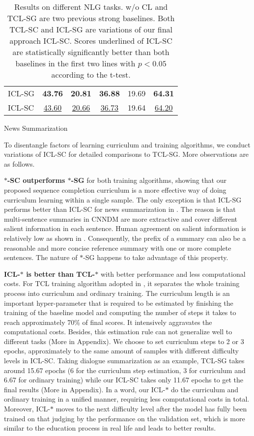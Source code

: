 \begin{table}[t]
\begin{subtable}{\linewidth}
\begin{tabular}{lccccc}
			ICL-SG & \textbf{43.76} & \textbf{20.81} & \textbf{36.88} & 19.69 & \textbf{64.31}\\
			ICL-SC & \underline{{43.60}} & \underline{{20.66}} & \underline{{36.73}} & 19.64 & \underline{{64.20}}\\
			\hline
		\end{tabular}
		\caption{News Summarization}
		\label{tab:end2endns}
	\end{subtable}
	\caption{Results on different NLG tasks. w/o CL and TCL-SG are two previous strong baselines. 
Both TCL-SC and ICL-SG are variations of our final approach ICL-SC. Scores underlined of ICL-SC 
are statistically significantly better than both baselines in the first two lines with $p<0.05$ 
according to the t-test. }	
	\label{tab:end2end}
\end{table}
To disentangle factors of learning curriculum and training algorithms, we conduct variations of ICL-SC for detailed comparisons to TCL-SG. More observations are as follows. 

\textbf{$\ast$-SC outperforms $\ast$-SG} for both training algorithms, showing that our proposed sequence completion curriculum is a more effective way of doing curriculum learning within a single sample. 
The only exception is that ICL-SG performs better than ICL-SC for news summarization in . The reason is that multi-sentence summaries in CNNDM are more extractive and cover different salient information in each sentence. Human agreement on salient information is relatively low as shown in . Consequently, the prefix of a summary can also be a reasonable and more concise 
reference summary with one or more complete sentences. The nature of $\ast$-SG happens to take advantage
of this property.

\textbf{ICL-$\ast$ is better than TCL-$\ast$} with better performance and less computational costs. For TCL training algorithm adopted in \citet{liang-etal-2021-token-wise}, it separates the whole training process into curriculum and ordinary training. The curriculum length is an important hyper-parameter that is required to be estimated by finishing the training of the baseline model and computing the number of steps it takes to reach approximately 70\% of final scores. It intensively aggravates the computational costs. Besides, this estimation rule can not generalize well to different tasks (More in Appendix). We choose to set curriculum steps to 2 or 3 epochs, approximately to the same amount of samples with different difficulty levels in ICL-SC. Taking dialogue summarization as an example, TCL-SG takes around 15.67 epochs (6 for the curriculum step estimation, 3 for curriculum and 6.67 for ordinary training) while our ICL-SC takes only 11.67 epochs to get the final results (More in Appendix). In a word, our ICL-$\ast$ do the curriculum and ordinary training in a unified manner, requiring less computational costs in total.
Moreover, ICL-$\ast$ moves to the next difficulty level after the model has fully been trained on that judging by the performance on the validation set, which is more similar to the education process in real life and leads to better results.

